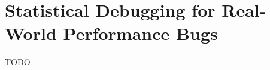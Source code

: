 \chapter[Statistical Debugging for Real-World Performance Bugs]{Statistical Debugging for Real-World Performance Bugs}
\label{chap:sd}

TODO




